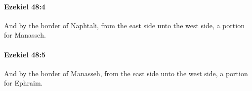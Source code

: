 		\paragraph{Ezekiel 48:4} %
			\label{EZEKIEL-48-4}

			And by the border of Naphtali, from the east side unto the west side, a portion for Manasseh.


		\paragraph{Ezekiel 48:5} %
			\label{EZEKIEL-48-5}

			And by the border of Manasseh, from the east side unto the west side, a portion for Ephraim.


